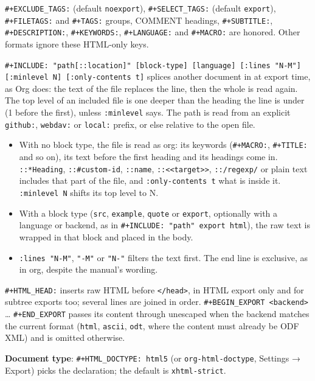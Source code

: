\documentclass[11pt]{article}
\begin{document}
\texttt{\#+EXCLUDE\_TAGS:} (default \texttt{noexport}), \texttt{\#+SELECT\_TAGS:} (default \texttt{export}), \texttt{\#+FILETAGS:} and \texttt{\#+TAGS:} groups, COMMENT headings, \texttt{\#+SUBTITLE:}, \texttt{\#+DESCRIPTION:}, \texttt{\#+KEYWORDS:}, \texttt{\#+LANGUAGE:} and \texttt{\#+MACRO:} are honored. Other formats ignore these HTML-only keys.

\texttt{\#+INCLUDE: "path[::location]" [block-type] [language] [:lines "N-M"] [:minlevel N] [:only-contents t]} splices another document in at export time, as Org does: the text of the file replaces the line, then the whole is read again. The top level of an included file is one deeper than the heading the line is under (1 before the first), unless \texttt{:minlevel} says. The path is read from an explicit \texttt{github:}, \texttt{webdav:} or \texttt{local:} prefix, or else relative to the open file.

\begin{itemize}
\item With no block type, the file is read as org: its keywords (\texttt{\#+MACRO:}, \texttt{\#+TITLE:} and so on), its text before the first heading and its headings come in. \texttt{::*Heading}, \texttt{::\#custom-id}, \texttt{::name}, \texttt{::<{}<{}target>{}>{}}, \texttt{::/regexp/} or plain text includes that part of the file, and \texttt{:only-contents t} what is inside it. \texttt{:minlevel N} shifts its top level to N.
\item With a block type (\texttt{src}, \texttt{example}, \texttt{quote} or \texttt{export}, optionally with a language or backend, as in \texttt{\#+INCLUDE: "path" export html}), the raw text is wrapped in that block and placed in the body.
\item \texttt{:lines "N-M"}, \texttt{"-M"} or \texttt{"N-"} filters the text first. The end line is exclusive, as in org, despite the manual's wording.
\end{itemize}

\texttt{\#+HTML\_HEAD:} inserts raw HTML before \texttt{</head>}, in HTML export only and for subtree exports too; several lines are joined in order. \texttt{\#+BEGIN\_EXPORT <backend>} \ldots{} \texttt{\#+END\_EXPORT} passes its content through unescaped when the backend matches the current format (\texttt{html}, \texttt{ascii}, \texttt{odt}, where the content must already be ODF XML) and is omitted otherwise.

\textbf{Document type}: \texttt{\#+HTML\_DOCTYPE: html5} (or \texttt{org-html-doctype}, Settings → Export) picks the declaration; the default is \texttt{xhtml-strict}.
\end{document}
